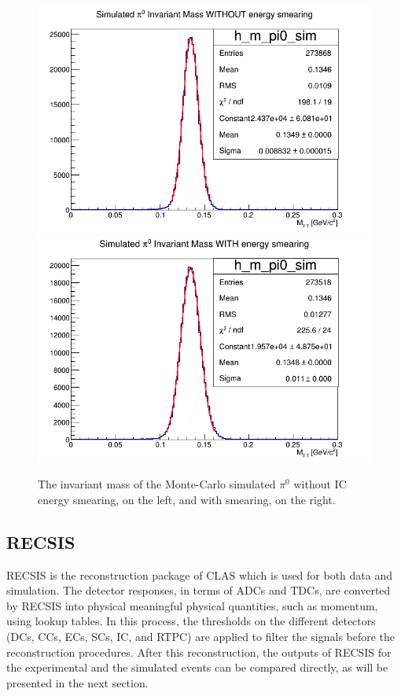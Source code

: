 \begin{figure}[tp]
\includegraphics[scale=0.32]{fig_simulation/m_pi0_sim_without_smearing.png}
\includegraphics[scale=0.32]{fig_simulation/m_pi0_sim_with_smearing.png}
\caption{The invariant mass of the Monte-Carlo simulated $\pi^{0}$ without IC energy smearing, on the left, and with smearing, on the right. } 
\label{fig:IC_smearing_factors}
\end{figure}

\subsection{RECSIS}

RECSIS is the reconstruction package of CLAS which is used for both data 
and simulation. The detector responses, in terms of ADCs and TDCs, are 
converted by RECSIS into physical meaningful physical quantities, such as 
momentum, using lookup tables. In this process, the thresholds on the different 
detectors (DCs, CCs, ECs, SCs, IC, and RTPC) are applied to filter the signals 
before the reconstruction procedures. After this reconstruction, the outputs of 
RECSIS for the experimental and the simulated events can be compared directly, 
as will be presented in the next section.

